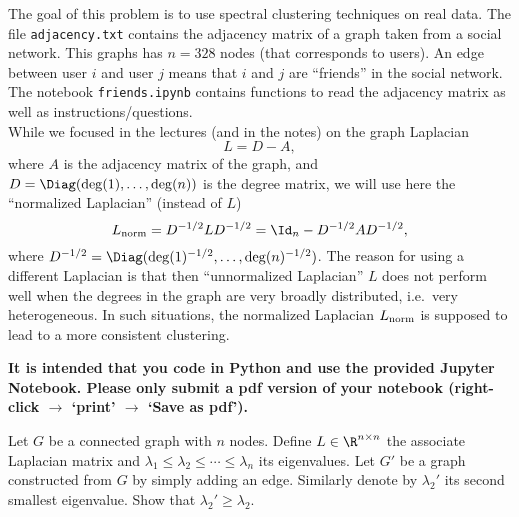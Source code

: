 \documentclass[11pt,nocut]{article}
\begin{document}
\begin{problem}[4 points]
	The goal of this problem is to use spectral clustering techniques on real data.
	The file \texttt{adjacency.txt} contains the adjacency matrix of a graph taken from a social network. This graphs has $n=328$ nodes (that corresponds to users). An edge between user $i$ and user $j$ means that $i$ and $j$ are ``friends'' in the social network.
	The notebook \texttt{friends.ipynb} contains functions to read the adjacency matrix as well as instructions/questions.
	\\

	While we focused in the lectures (and in the notes) on the graph Laplacian
	$$
	L = D - A,
	$$
	where $A$ is the adjacency matrix of the graph, and $D = \Diag(\deg(1), \dots, \deg(n))$ is the degree matrix, we will use here the ``normalized Laplacian'' (instead of $L$)
	$$
	L_{\rm norm} = D^{-1/2} L D^{-1/2} = \Id_n - D^{-1/2} A D^{-1/2},
	$$
	where $D^{-1/2} = \Diag(\deg(1)^{-1/2}, \dots, \deg(n)^{-1/2})$. The reason for using a different Laplacian is that then ``unnormalized Laplacian'' $L$ does not perform well when the degrees in the graph are very broadly distributed, i.e.\ very heterogeneous. In such situations, the normalized Laplacian $L_{\rm norm}$ is supposed to lead to a more consistent clustering.

	\textbf{It is intended that you code in Python and use the provided Jupyter Notebook. Please only submit a pdf version of your notebook (right-click $\to$ `print' $\to$ `Save as pdf').}
\end{problem}

\vspace{5mm}

\begin{problem}[$\star$]
	Let $G$ be a connected graph with $n$ nodes. Define $L \in \R^{n \times n}$ the associate Laplacian matrix and $\lambda_1 \leq \lambda_2 \leq \cdots \leq \lambda_n$ its eigenvalues. Let $G'$ be a graph constructed from $G$ by simply adding an edge. Similarly denote by $\lambda_2'$ its second smallest eigenvalue. Show that  $\lambda_2' \geq \lambda_2$. 
\end{problem}


%
%
\end{document}
